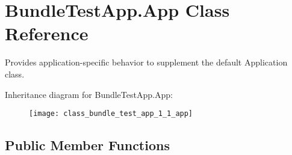 \section{Bundle\+Test\+App.\+App Class Reference}
\label{class_bundle_test_app_1_1_app}


Provides application-\/specific behavior to supplement the default Application class.  


Inheritance diagram for Bundle\+Test\+App.\+App\+:\begin{figure}[H]
\begin{center}
\leavevmode
\texttt{[image: class\_bundle\_test\_app\_1\_1\_app]}
\end{center}
\end{figure}
\subsection*{Public Member Functions}
